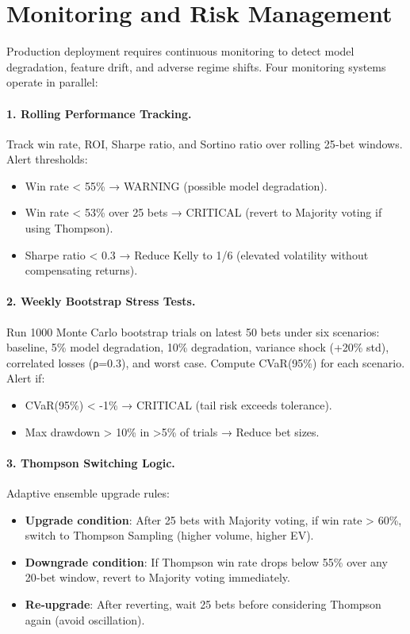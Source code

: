 \section{Monitoring and Risk Management}
\label{sec:monitoring}

Production deployment requires continuous monitoring to detect model degradation, feature drift, and adverse regime shifts. Four monitoring systems operate in parallel:

\paragraph{1. Rolling Performance Tracking.}
Track win rate, ROI, Sharpe ratio, and Sortino ratio over rolling 25‑bet windows. Alert thresholds:
\begin{itemize}
\item Win rate < 55\% → WARNING (possible model degradation).
\item Win rate < 53\% over 25 bets → CRITICAL (revert to Majority voting if using Thompson).
\item Sharpe ratio < 0.3 → Reduce Kelly to 1/6 (elevated volatility without compensating returns).
\end{itemize}

\paragraph{2. Weekly Bootstrap Stress Tests.}
Run 1000 Monte Carlo bootstrap trials on latest 50 bets under six scenarios: baseline, 5\% model degradation, 10\% degradation, variance shock (+20\% std), correlated losses (ρ=0.3), and worst case. Compute CVaR(95\%) for each scenario. Alert if:
\begin{itemize}
\item CVaR(95\%) < -1\% → CRITICAL (tail risk exceeds tolerance).
\item Max drawdown > 10\% in >5\% of trials → Reduce bet sizes.
\end{itemize}

\paragraph{3. Thompson Switching Logic.}
Adaptive ensemble upgrade rules:
\begin{itemize}
\item \textbf{Upgrade condition}: After 25 bets with Majority voting, if win rate > 60\%, switch to Thompson Sampling (higher volume, higher EV).
\item \textbf{Downgrade condition}: If Thompson win rate drops below 55\% over any 20‑bet window, revert to Majority voting immediately.
\item \textbf{Re‑upgrade}: After reverting, wait 25 bets before considering Thompson again (avoid oscillation).
\end{itemize}

